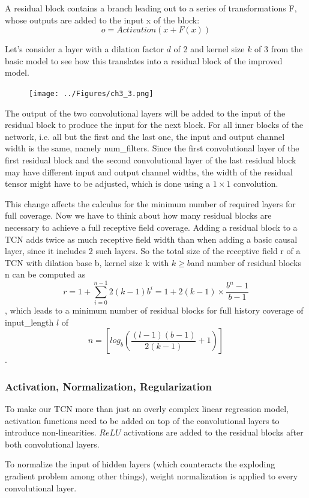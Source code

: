 A residual block contains a branch leading out to a series of transformations F, whose outputs are added to the input x of the block: $$o=Activation(x+F(x))$$

Let’s consider a layer with a dilation factor $d$ of 2 and kernel size $k$ of 3 from the basic model to see how this translates into a residual block of the improved model.
\begin{figure}[H]
    \texttt{[image: ../Figures/ch3\_3.png]}
\end{figure}

The output of the two convolutional layers will be added to the input of the residual block to produce the input for the next block. For all inner blocks of the network, i.e. all but the first and the last one, the input and output channel width is the same, namely num\_filters. Since the first convolutional layer of the first residual block and the second convolutional layer of the last residual block may have different input and output channel widths, the width of the residual tensor might have to be adjusted, which is done using a $1\times1$ convolution.

This change affects the calculus for the minimum number of required layers for full coverage. Now we have to think about how many residual blocks are necessary to achieve a full receptive field coverage. Adding a residual block to a TCN adds twice as much receptive field width than when adding a basic causal layer, since it includes 2 such layers. So the total size of the receptive field r of a TCN with dilation base b, kernel size k with $k \geq b $and number of residual blocks n can be computed as $$r = 1 + \sum_{i=0}^{n-1}2(k-1)b^i=1+2(k-1)\times \frac{b^n-1}{b-1}$$, which leads to a minimum number of residual blocks  for full history coverage of input\_length $l$ of $$n=\left[log_b(\frac{(l-1)(b-1)}{2(k-1)}+1)\right]$$.

\subsubsection{Activation, Normalization, Regularization}
To make our TCN more than just an overly complex linear regression model, activation functions need to be added on top of the convolutional layers to introduce non-linearities. $ReLU$ activations are added to the residual blocks after both convolutional layers.

To normalize the input of hidden layers (which counteracts the exploding gradient problem among other things), weight normalization is applied to every convolutional layer.

